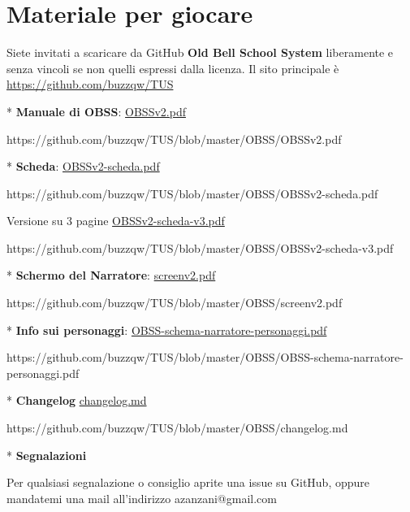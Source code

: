 \section{Materiale per giocare}

\label{scheda-e-manuale}

Siete invitati a scaricare da GitHub \textbf{Old Bell School System} liberamente e senza vincoli se non quelli espressi dalla licenza.
Il sito principale è \href{https://github.com/buzzqw/TUS}{https://github.com/buzzqw/TUS}

\medskip

* \textbf{Manuale di OBSS}:
\href{https://github.com/buzzqw/TUS/blob/master/OBSS/OBSSv2.pdf}{OBSSv2.pdf}

https://github.com/buzzqw/TUS/blob/master/OBSS/OBSSv2.pdf

\smallskip

* \textbf{Scheda}:
\href{https://github.com/buzzqw/TUS/blob/master/OBSS/OBSSv2-scheda.pdf}{OBSSv2-scheda.pdf}

https://github.com/buzzqw/TUS/blob/master/OBSS/OBSSv2-scheda.pdf

\smallskip

Versione su 3 pagine
\href{https://github.com/buzzqw/TUS/blob/master/OBSS/OBSSv2-scheda-v3.pdf}{OBSSv2-scheda-v3.pdf}

https://github.com/buzzqw/TUS/blob/master/OBSS/OBSSv2-scheda-v3.pdf

\smallskip

* \textbf{Schermo del Narratore}:
\href{https://github.com/buzzqw/TUS/blob/master/OBSS/screenv2.pdf}{screenv2.pdf}

https://github.com/buzzqw/TUS/blob/master/OBSS/screenv2.pdf

\smallskip

* \textbf{Info sui personaggi}:
\href{https://github.com/buzzqw/TUS/blob/master/OBSS/OBSS-schema-narratore-personaggi.pdf}{OBSS-schema-narratore-personaggi.pdf}

https://github.com/buzzqw/TUS/blob/master/OBSS/OBSS-schema-narratore-personaggi.pdf

\smallskip

* \textbf{Changelog} \href{https://github.com/buzzqw/TUS/blob/master/OBSS/changelog.md}{changelog.md}

https://github.com/buzzqw/TUS/blob/master/OBSS/changelog.md

\smallskip

* \textbf{Segnalazioni}

Per qualsiasi segnalazione o consiglio aprite una issue su GitHub, oppure mandatemi una mail all'indirizzo azanzani@gmail.com
